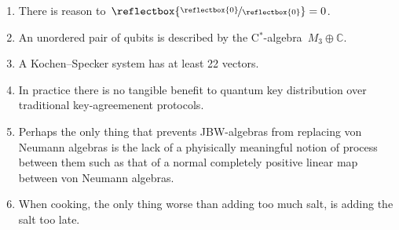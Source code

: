 \documentclass{article}
\newcommand\rfrac[2]{\reflectbox{\nicefrac{\reflectbox{\ensuremath{#1}}}{\reflectbox{\ensuremath{#2}}}}}
\begin{document}
\begin{enumerate}
\item
    There is reason to~$\rfrac{0}{0}=0$.
\item
    An unordered pair of qubits is described
        by the C$^*$-algebra~$M_3 \oplus \mathbb{C}$.
\item
    A Kochen--Specker system has at least 22 vectors.
\item
    In practice there is no tangible benefit
        to quantum key distribution over traditional key-agreemenent protocols.
\item
    Perhaps the only thing that prevents JBW-algebras from replacing
            von Neumann algebras is
            the lack of a phyisically meaningful notion
            of process between them
            such as that of a normal completely positive linear map
            between von Neumann algebras.
\item
    When cooking,
        the only thing worse than adding too much salt,
        is adding the salt too late.
\end{enumerate}
\end{document}
